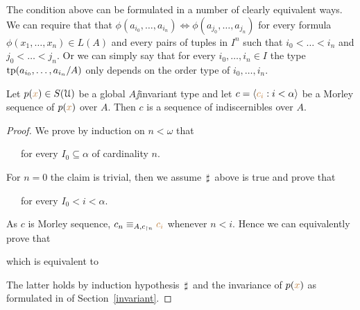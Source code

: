 \documentclass[creche.tex]{subfiles}
\begin{document}
The condition above can be formulated in a number of clearly equivalent ways. We can require that that $\phi(a_{i_0},\dots,a_{i_n})\iff\phi(a_{j_0},\dots,a_{j_n})$ for every formula $\phi(x_1,\dots,x_n)\in L(A)$ and every pairs of tuples in $I^n$ such that $i_0<\dots<i_n$ and $j_0<\dots<j_n$. Or we can simply say that for every $i_0,\dots,i_n\in I$ the type ${\rm tp}(a_{i_0},\dots,a_{i_n}/A)$ only depends on the order type of $i_0,\dots,i_n$.




\begin{proposition}
Let $p({\color{brown} x})\in S(\EuScript U)$ be a global $A\jj$invariant type and let $c=\langle{\color{brown}c_i}:i<\alpha\rangle$ be a Morley sequence of $p({\color{brown} x})$ over $A$. Then $c$ is a sequence of indiscernibles over $A$.
\end{proposition}

\begin{proof}


We prove by induction on $n<\omega$ that

\ \ \ for every $I_0\subseteq\alpha$ of cardinality $n$.

For $n=0$ the claim is trivial, then we assume $\,\sharp\,$ above is true and prove that

\ \ \ for every $I_0<i<\alpha$.

As $c$ is  Morley sequence, $c_n\equiv_{A,c_{\restriction n}} {\color{brown} c_i}$ whenever $n<i$. Hence we can equivalently prove that


which is equivalent to


The latter holds by induction hypothesis $\,\sharp\,$ and the invariance of $p({\color{brown} x})$ as formulated in  of Section~\ref{invariant}.
\end{proof}

\end{document}
